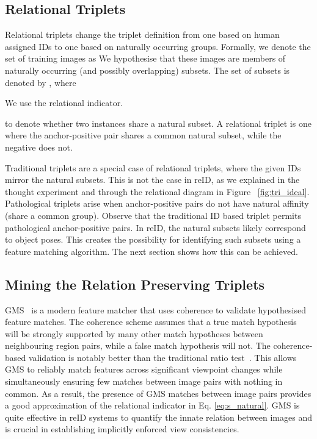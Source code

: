 \documentclass[10pt,twocolumn,letterpaper]{article}
\begin{document}
\subsection{Relational Triplets}
Relational triplets change  the triplet definition  from one based on
 human assigned IDs to one based on naturally occurring groups. 
Formally, we denote the set of training images as 
We hypothesise that these images are members of naturally occurring (and possibly overlapping)  subsets.
The set of subsets is denoted by ,
 where

 
We use the relational indicator.
 
to denote whether two  instances share  a  natural subset. A  relational triplet is one where 
   the  anchor-positive pair  shares a common natural subset, while the negative does not.
	
   
Traditional triplets are a special case of relational triplets, where  
the  given IDs mirror the natural subsets. 
This is not the case in reID,
as we explained in the thought experiment and through the relational diagram in Figure ~\ref{fig:tri_ideal}. Pathological triplets arise when anchor-positive pairs do not have natural affinity (share a common group). Observe that the traditional ID based triplet permits pathological anchor-positive pairs.  In  reID, the natural  subsets likely correspond to object poses. This creates the possibility for  identifying such subsets
 using a  feature matching algorithm. The next section shows how this can be achieved.  







\subsection{Mining the Relation Preserving Triplets}
\label{sec:tri}

GMS~\cite{bian2017gms} is a modern feature matcher that uses coherence to validate hypothesised feature matches. 
The coherence scheme assumes that a true match hypothesis will be strongly supported by many other match hypotheses between
neighbouring region pairs, while a false
  match hypothesis will not.  The coherence-based   validation is notably better than the  traditional ratio test~\cite{lowe1999object}.
  This allows GMS to reliably match features across significant viewpoint changes while simultaneously ensuring  
  few  matches between image pairs with nothing in  common. 
  As a result,  the presence of GMS matches between image pairs provides a good approximation of the  
    relational indicator in Eq. \ref{eq:s_natural}. GMS is quite effective in reID systems to quantify the innate relation between images and is crucial in establishing implicitly enforced view consistencies.
\end{document}
